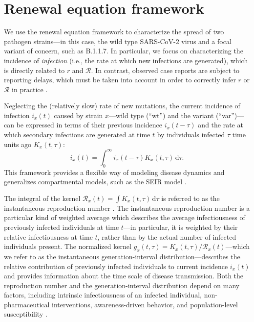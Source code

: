 \documentclass[12pt]{article}
\newcommand{\RR}{\ensuremath{{\mathcal R}}\xspace}
\newcommand{\dd}[1]{\ensuremath{\, \mathrm{d}#1}}
\newcommand{\dtau}{\dd{\tau}}
\begin{document}
\section{Renewal equation framework}

We use the renewal equation framework to characterize the spread of two pathogen strains---in this case, the wild type SARS-CoV-2 virus and a focal variant of concern, such as B.1.1.7.
In particular, we focus on characterizing the incidence of \emph{infection} (i.e., the rate at which new infections are generated), which is directly related to $r$ and $\RR$.
In contrast, observed case reports are subject to reporting delays, which must be taken into account in order to correctly infer $r$ or $\RR$ in practice \citep{goldstein2009reconstructing,gostic2020practical}.

Neglecting the (relatively slow) rate of new mutations, the current incidence of infection $i_x(t)$ caused by strain $x$---wild type (``wt'') and the variant (``var'')---can be expressed in terms of their previous incidence $i_x(t-\tau)$ and the rate at which secondary infections are generated at time $t$ by individuals infected $\tau$ time units ago $K_x(t, \tau)$:
\begin{equation}
i_x(t) = \int_0^\infty i_x(t-\tau) K_x(t, \tau) \dtau.
\end{equation}
This framework provides a flexible way of modeling disease dynamics and generalizes compartmental models, such as the SEIR model \citep{heesterbeek1996concept, diekmann2000mathematical, roberts2004modelling, aldis2005integral, roberts2007model, champredon2018equivalence}.

The integral of the kernel $\RR_x(t) = \int K_x(t, \tau) \dtau$ is referred to as the instantaneous reproduction number \citep{fraser2007estimating}.
The instantaneous reproduction number is a particular kind of weighted average which describes the average infectiousness of previously infected individuals at time $t$---in particular, it is weighted by their relative infectiousness at time $t$, rather than by the actual number of infected individuals present.
The normalized kernel $g_x(t, \tau) = K_x(t, \tau)/\RR_x(t)$---which we refer to as the instantaneous generation-interval distribution---describes the relative contribution of previously infected individuals to current incidence $i_x(t)$ and provides information about the time scale of disease transmission.
Both the reproduction number and the generation-interval distribution depend on many factors, including intrinsic infectiousness of an infected individual, non-pharmaceutical interventions, awareness-driven behavior, and population-level susceptibility \citep{fraser2007estimating}.
\end{document}
